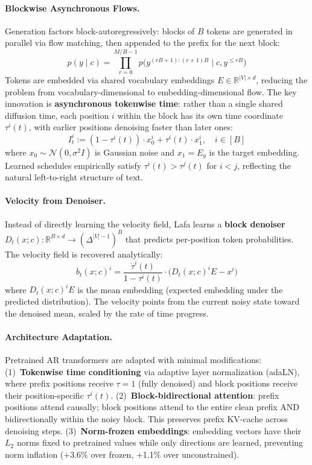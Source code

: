 \documentclass[11pt,a4paper]{article}
\begin{document}
\paragraph{Blockwise Asynchronous Flows.}
Generation factors block-autoregressively: blocks of $B$ tokens are generated in parallel via flow matching, then appended to the prefix for the next block:
\begin{equation}
p(y \mid c) = \prod_{r=0}^{M/B - 1} p\bigl(y^{(rB+1):(r+1)B} \mid c, y^{\leq rB}\bigr)
\end{equation}
Tokens are embedded via shared vocabulary embeddings $E \in \mathbb{R}^{|V| \times d}$, reducing the problem from vocabulary-dimensional to embedding-dimensional flow. The key innovation is \textbf{asynchronous tokenwise time}: rather than a single shared diffusion time, each position $i$ within the block has its own time coordinate $\tau^i(t)$, with earlier positions denoising faster than later ones:
\begin{equation}
I_t^i := (1 - \tau^i(t)) \cdot x_0^i + \tau^i(t) \cdot x_1^i, \quad i \in [B]
\end{equation}
where $x_0 \sim \mathcal{N}(0, \sigma^2 I)$ is Gaussian noise and $x_1 = E_y$ is the target embedding. Learned schedules empirically satisfy $\tau^i(t) > \tau^j(t)$ for $i < j$, reflecting the natural left-to-right structure of text.

\paragraph{Velocity from Denoiser.}
Instead of directly learning the velocity field, Lafa learns a \textbf{block denoiser} $D_t(x; c) : \mathbb{R}^{B \times d} \to (\Delta^{|V|-1})^B$ that predicts per-position token probabilities. The velocity field is recovered analytically:
\begin{equation}
b_t(x; c)^i = \frac{\dot{\tau}^i(t)}{1 - \tau^i(t)} \cdot \bigl(D_t(x; c)^i E - x^i\bigr)
\end{equation}
where $D_t(x; c)^i E$ is the mean embedding (expected embedding under the predicted distribution). The velocity points from the current noisy state toward the denoised mean, scaled by the rate of time progress.

\paragraph{Architecture Adaptation.}
Pretrained AR transformers are adapted with minimal modifications: (1)~\textbf{Tokenwise time conditioning} via adaptive layer normalization (adaLN), where prefix positions receive $\tau = 1$ (fully denoised) and block positions receive their position-specific $\tau^i(t)$. (2)~\textbf{Block-bidirectional attention}: prefix positions attend causally; block positions attend to the entire clean prefix AND bidirectionally within the noisy block. This preserves prefix KV-cache across denoising steps. (3)~\textbf{Norm-frozen embeddings}: embedding vectors have their $L_2$ norms fixed to pretrained values while only directions are learned, preventing norm inflation ($+$3.6\% over frozen, $+$1.1\% over unconstrained).
\end{document}
